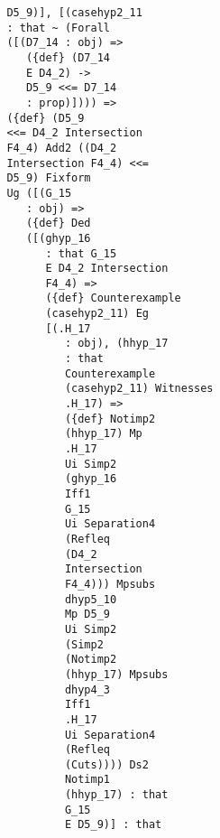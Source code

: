 \documentclass[12pt]{article}
\begin{document}
\begin{verbatim}
                            D5_9)], [(casehyp2_11 
                            : that ~ (Forall 
                            ([(D7_14 : obj) => 
                               ({def} (D7_14 
                               E D4_2) -> 
                               D5_9 <<= D7_14 
                               : prop)]))) => 
                            ({def} (D5_9 
                            <<= D4_2 Intersection 
                            F4_4) Add2 ((D4_2 
                            Intersection F4_4) <<= 
                            D5_9) Fixform 
                            Ug ([(G_15 
                               : obj) => 
                               ({def} Ded 
                               ([(ghyp_16 
                                  : that G_15 
                                  E D4_2 Intersection 
                                  F4_4) => 
                                  ({def} Counterexample 
                                  (casehyp2_11) Eg 
                                  [(.H_17 
                                     : obj), (hhyp_17 
                                     : that 
                                     Counterexample 
                                     (casehyp2_11) Witnesses 
                                     .H_17) => 
                                     ({def} Notimp2 
                                     (hhyp_17) Mp 
                                     .H_17 
                                     Ui Simp2 
                                     (ghyp_16 
                                     Iff1 
                                     G_15 
                                     Ui Separation4 
                                     (Refleq 
                                     (D4_2 
                                     Intersection 
                                     F4_4))) Mpsubs 
                                     dhyp5_10 
                                     Mp D5_9 
                                     Ui Simp2 
                                     (Simp2 
                                     (Notimp2 
                                     (hhyp_17) Mpsubs 
                                     dhyp4_3 
                                     Iff1 
                                     .H_17 
                                     Ui Separation4 
                                     (Refleq 
                                     (Cuts)))) Ds2 
                                     Notimp1 
                                     (hhyp_17) : that 
                                     G_15 
                                     E D5_9)] : that 

\end{verbatim}
\end{document}
